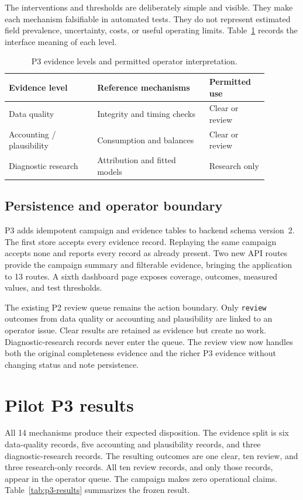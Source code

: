\documentclass[11pt,a4paper]{article}
\begin{document}
The interventions and thresholds are deliberately simple and visible. They
make each mechanism falsifiable in automated tests. They do not represent
estimated field prevalence, uncertainty, costs, or useful operating limits.
Table~\ref{tab:p3-levels} records the interface meaning of each level.

\begin{table}[htbp]
  \centering
  \caption{P3 evidence levels and permitted operator interpretation.}
  \label{tab:p3-levels}
  \begin{tabular}{p{0.30\linewidth}p{0.38\linewidth}p{0.20\linewidth}}
    \toprule
    Evidence level & Reference mechanisms & Permitted use \\
    \midrule
    Data quality & Integrity and timing checks & Clear or review \\
    Accounting / plausibility & Consumption and balances &
      Clear or review \\
    Diagnostic research & Attribution and fitted models & Research only \\
    \bottomrule
  \end{tabular}
\end{table}

\subsection{Persistence and operator boundary}
P3 adds idempotent campaign and evidence tables to backend schema version~2.
The first store accepts every evidence record. Replaying the same campaign
accepts none and reports every record as already present. Two new API routes
provide the campaign summary and filterable evidence, bringing the application
to 13 routes. A sixth dashboard page exposes coverage, outcomes, measured
values, and test thresholds.

The existing P2 review queue remains the action boundary. Only \texttt{review}
outcomes from data quality or accounting and plausibility are linked to an
operator issue. Clear results are retained as evidence but create no work.
Diagnostic-research records never enter the queue. The review view now handles
both the original completeness evidence and the richer P3 evidence without
changing status and note persistence.

\section{Pilot P3 results}
All 14 mechanisms produce their expected disposition. The evidence split is
six data-quality records, five accounting and plausibility records, and three
diagnostic-research records. The resulting outcomes are one clear, ten review,
and three research-only records. All ten review records, and only those
records, appear in the operator queue. The campaign makes zero operational
claims. Table~\ref{tab:p3-results} summarizes the frozen result.
\end{document}
